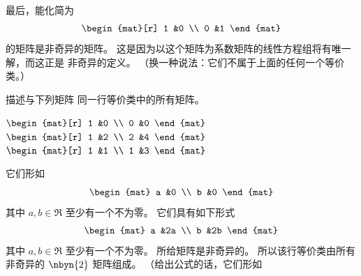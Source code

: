 \begin{exercises}
\begin{answer}
       最后，能化简为 
       \begin{equation*}
         \begin{mat}[r]
           1  &0  \\
           0  &1
         \end{mat}
       \end{equation*}
       的矩阵是非奇异的矩阵。
       这是因为以这个矩阵为系数矩阵的线性方程组将有唯一解，而这正是
       非奇异的定义。
       （换一种说法：它们不属于上面的任何一个等价类。）
     \end{answer}
  \item 
    描述与下列矩阵
    同一行等价类中的所有矩阵。
    \begin{exparts*}
       \partsitem  \(
           \begin{mat}[r]
             1  &0  \\
             0  &0
           \end{mat}  \)
       \partsitem  \(
           \begin{mat}[r]
             1  &2      \\
             2  &4
           \end{mat} \)
       \partsitem \(
           \begin{mat}[r]
             1  &1      \\
             1  &3
           \end{mat} \)
    \end{exparts*}
    \begin{answer}
      \begin{exparts}
        \partsitem 它们形如
          \begin{equation*}
            \begin{mat}
              a  &0  \\
              b  &0
            \end{mat}
          \end{equation*}
          其中 \( a,b\in\Re \) 至少有一个不为零。
        \partsitem 它们具有如下形式 
          \begin{equation*}
            \begin{mat}
             a  &2a \\
             b  &2b
            \end{mat}
          \end{equation*}
          其中 \( a,b\in\Re \) 至少有一个不为零。
        \partsitem 所给矩阵是非奇异的。
          所以该行等价类由所有非奇异的 $\nbyn{2}$
          矩阵组成。
          （给出公式的话，它们形如

\end{exparts}
\end{answer}
\end{exercises}
